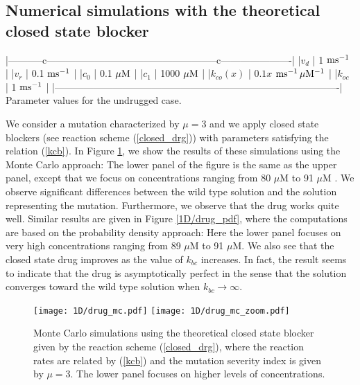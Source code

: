 \subsection{Numerical simulations with the theoretical closed state blocker}

|-----------c-----------------------------------------------------c----------------------|
|$v_d $                                            | 1 $\rm{ms^{-1}}$                    |
|$v_r $                                            | 0.1 $\rm{ms^{-1}}$                  |
|$c_0 $                                            | 0.1 $\rm{\mu M}$                    |
|$c_1 $                                            | 1000 $\rm{\mu M}$                   |
|$k_{co}(x) $                                      | $0.1x$ $\rm{ms^{-1}\, \mu M^{-1}} $ |
|$k_{oc} $                                         | 1 $\rm{ms^{-1}}$                    |
|----------------------------------------------------------------------------------------|
Parameter values for the undrugged case.\label{tab:1Drepeat}

We consider a mutation characterized by $\mu=3$ and we apply closed state blockers (see reaction scheme (\ref{closed_drg})) with
parameters  satisfying the relation
(\ref{kcb}). In Figure \ref{1D/drug_mc}, we show the results of these simulations using the Monte Carlo approach: The lower panel of the figure is the same as the upper panel, except that we focus on concentrations ranging from 80 $\mu$M  to 91 $\mu$M . We observe significant differences between the wild type solution and the solution representing the mutation. Furthermore, we observe that the drug works quite well.  Similar results are given in Figure \ref{1D/drug_pdf}, where the computations are based on the probability density approach: Here the lower panel focuses on very high concentrations ranging from 89 $\mu$M  to 91 $\mu$M. We also see that the closed state drug improves as the value of $k_{bc}$ increases. In fact, the result seems to indicate that the drug is asymptotically perfect in the sense that the solution converges toward the wild type solution when $k_{bc}\rightarrow \infty$.


\begin{figure}[p]\centering
\vbox{
\texttt{[image: 1D/drug\_mc.pdf]}
\texttt{[image: 1D/drug\_mc\_zoom.pdf]}
}
\caption{Monte Carlo simulations using the theoretical closed state blocker given by the reaction scheme (\ref{closed_drg}), where the reaction rates are related by (\ref{kcb}) and the mutation severity index is given by $\mu=3$. The lower panel focuses on higher levels of concentrations. \label{1D/drug_mc}}
\end{figure}


